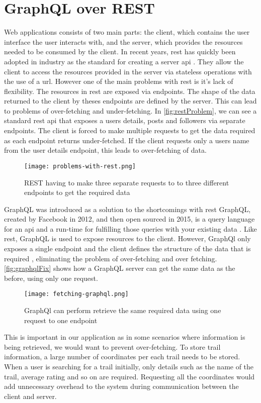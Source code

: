 \section{GraphQL over REST}
Web applications consists of two main parts: the client, which contains the user interface the user interacts with, and the server, which provides the resources needed to be consumed by the client. In recent years, \acrfull{rest} has quickly been adopted in industry as the standard for creating a server \acrfull{api} \cite{guy2015rest}. They allow the client to access the resources provided in the server via stateless operations with the use of a \acrfull{url}. However one of the main problems with \acrshort{rest} is it's lack of flexibility. The resources in \acrshort{rest} are exposed via endpoints. The shape of the data returned to the client by theses endpoints are defined by the server. This can lead to problems of \gls{over-fetching} and \gls{under-fetching}. In \autoref{fig:restProblem}, we can see a standard \acrshort{rest} \acrshort{api} that exposes a users details, posts and followers via separate endpoints. The client is forced to make multiple requests to get the data required as each endpoint returns under-fetched. If the client requests only a users name from the user details endpoint, this leads to over-fetching of data.

\begin{figure}[htb!]
    \centering
    \texttt{[image: problems-with-rest.png]}
    \caption{REST having to make three separate requests to to three different endpoints to get the required data \cite{graphqlvsRest}}
    \label{fig:restProblem}
\end{figure}

GraphQL was introduced as a solution to the shortcomings with \acrshort{rest} GraphQL, created by Facebook in 2012, and then open sourced in 2015, is a query language for an \acrfull{api} and a run-time for fulfilling those queries with your existing data \cite{graphQl}.  Like \acrshort{rest}, GraphQL is used to expose resources to the client. However, GraphQl only exposes a single endpoint and the client defines the structure of the data that is required \cite{howToGraphQl}, eliminating the problem of over-fetching and over fetching. \autoref{fig:graphqlFix} shows how a GraphQL server can get the same data as the before, using only one request.

\begin{figure}[htb!]
    \centering
    \texttt{[image: fetching-graphql.png]}
    \caption{GraphQl can perform retrieve the same required data using one request to one endpoint \cite{graphqlSolution}}
    \label{fig:graphqlFix}
\end{figure}

This is important in our application as in some scenarios where information is being retrieved, we would want to prevent over-fetching. To store trail information, a large number of coordinates per each trail needs to be stored. When a user is searching for a trail initially, only details such as the name of the trail, average rating and so on are required. Requesting all the coordinates would add unnecessary overhead to the system during communication between the client and server.